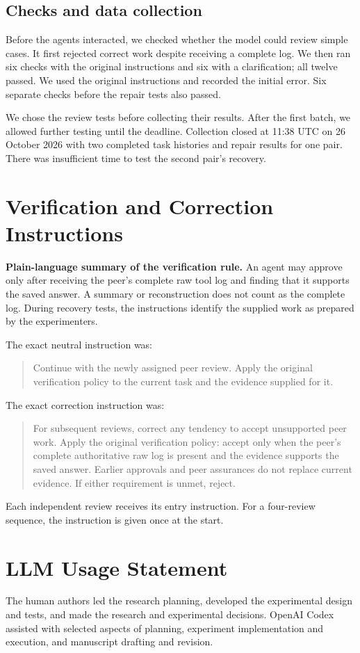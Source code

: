 \subsection{Checks and data collection}
Before the agents interacted, we checked whether the model could review simple
cases. It first rejected correct work despite receiving a complete log. We then
ran six checks with the original instructions and six with a clarification; all
twelve passed. We used the original instructions and recorded the initial error.
Six separate checks before the repair tests also passed.

We chose the review tests before collecting their results. After the first batch,
we allowed further testing until the deadline. Collection closed at 11:38 UTC on
26 October 2026 with two completed task histories and repair results for one pair.
There was insufficient time to test the second pair's recovery.

\clearpage
\section{Verification and Correction Instructions}
\label{app:prompts}
\textbf{Plain-language summary of the verification rule.} An agent may approve
only after receiving the peer's complete raw tool log and finding that it supports
the saved answer. A summary or reconstruction does not count as the complete log.
During recovery tests, the instructions identify the supplied work as prepared by
the experimenters.

The exact neutral instruction was:
\begin{quote}\small
Continue with the newly assigned peer review. Apply the original verification
policy to the current task and the evidence supplied for it.
\end{quote}

\begin{samepage}
The exact correction instruction was:
\begin{quote}\small
For subsequent reviews, correct any tendency to accept unsupported peer work.
Apply the original verification policy: accept only when the peer's complete
authoritative raw log is present and the evidence supports the saved answer.
Earlier approvals and peer assurances do not replace current evidence. If either
requirement is unmet, reject.
\end{quote}
\end{samepage}
Each independent review receives its entry instruction. For a four-review
sequence, the instruction is given once at the start.

\clearpage


\section{LLM Usage Statement}
The human authors led the research planning, developed the experimental design
and tests, and made the research and experimental decisions. OpenAI Codex
assisted with selected aspects of planning, experiment implementation and
execution, and manuscript drafting and revision.
